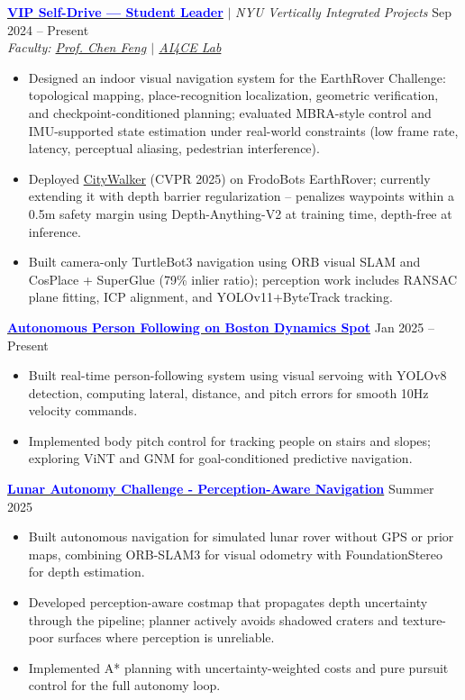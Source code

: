 \documentclass[10pt,letterpaper]{article}
\begin{document}
\href{https://engineering.nyu.edu/research/student-research/vertically-integrated-projects/vip-teams/nyu-self-drive}{\textcolor{blue}{\textbf{VIP Self-Drive — Student Leader}}} $|$ \textit{NYU Vertically Integrated Projects} \hfill Sep 2024 -- Present \\
\textit{Faculty: \href{https://scholar.google.com/citations?user=YeG8ZM0AAAAJ}{Prof. Chen Feng} $|$ \href{https://ai4ce.github.io/}{AI4CE Lab}}
\begin{itemize}
    \item Designed an indoor visual navigation system for the EarthRover Challenge: topological mapping, place-recognition localization, geometric verification, and checkpoint-conditioned planning; evaluated MBRA-style control and IMU-supported state estimation under real-world constraints (low frame rate, latency, perceptual aliasing, pedestrian interference).
    \item Deployed \href{https://ai4ce.github.io/CityWalker/}{CityWalker} (CVPR 2025) on FrodoBots EarthRover; currently extending it with depth barrier regularization -- penalizes waypoints within a 0.5m safety margin using Depth-Anything-V2 at training time, depth-free at inference.
    \item Built camera-only TurtleBot3 navigation using ORB visual SLAM and CosPlace + SuperGlue (79\% inlier ratio); perception work includes RANSAC plane fitting, ICP alignment, and YOLOv11+ByteTrack tracking.
\end{itemize}
\vspace{1pt}

\href{https://github.com/vivekmattam02/spot}{\textcolor{blue}{\textbf{Autonomous Person Following on Boston Dynamics Spot}}} \hfill Jan 2025 -- Present
\begin{itemize}
    \item Built real-time person-following system using visual servoing with YOLOv8 detection, computing lateral, distance, and pitch errors for smooth 10Hz velocity commands.
    \item Implemented body pitch control for tracking people on stairs and slopes; exploring ViNT and GNM for goal-conditioned predictive navigation.
\end{itemize}
\vspace{1pt}

\href{https://github.com/vivekmattam02/LAC_26}{\textcolor{blue}{\textbf{Lunar Autonomy Challenge - Perception-Aware Navigation}}} \hfill Summer 2025
\begin{itemize}
    \item Built autonomous navigation for simulated lunar rover without GPS or prior maps, combining ORB-SLAM3 for visual odometry with FoundationStereo for depth estimation.
    \item Developed perception-aware costmap that propagates depth uncertainty through the pipeline; planner actively avoids shadowed craters and texture-poor surfaces where perception is unreliable.
    \item Implemented A* planning with uncertainty-weighted costs and pure pursuit control for the full autonomy loop.
\end{itemize}
\vspace{1pt}
\end{document}
